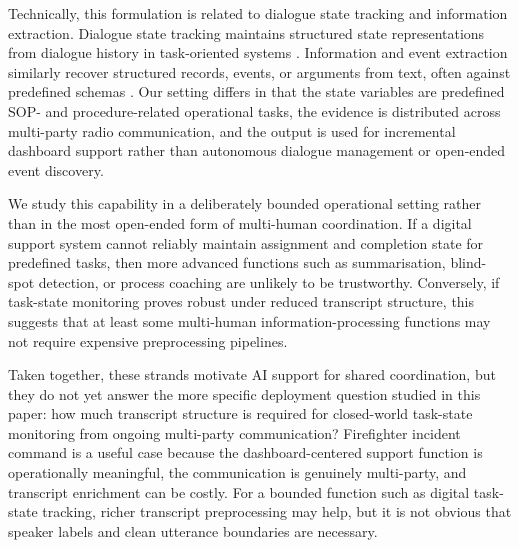 Technically, this formulation is related to dialogue state tracking and information extraction. Dialogue state tracking maintains structured state representations from dialogue history in task-oriented systems \citep{Balaraman2021DSTSurvey}. Information and event extraction similarly recover structured records, events, or arguments from text, often against predefined schemas \citep{ChambersJurafsky2011,XiangWang2019EventSurvey}. Our setting differs in that the state variables are predefined SOP- and procedure-related operational tasks, the evidence is distributed across multi-party radio communication, and the output is used for incremental dashboard support rather than autonomous dialogue management or open-ended event discovery.

We study this capability in a deliberately bounded operational setting rather than in the most open-ended form of multi-human coordination. If a digital support system cannot reliably maintain assignment and completion state for predefined tasks, then more advanced functions such as summarisation, blind-spot detection, or process coaching are unlikely to be trustworthy. Conversely, if task-state monitoring proves robust under reduced transcript structure, this suggests that at least some multi-human information-processing functions may not require expensive preprocessing pipelines.

Taken together, these strands motivate AI support for shared coordination, but they do not yet answer the more specific deployment question studied in this paper: how much transcript structure is required for closed-world task-state monitoring from ongoing multi-party communication? Firefighter incident command is a useful case because the dashboard-centered support function is operationally meaningful, the communication is genuinely multi-party, and transcript enrichment can be costly. For a bounded function such as digital task-state tracking, richer transcript preprocessing may help, but it is not obvious that speaker labels and clean utterance boundaries are necessary.
